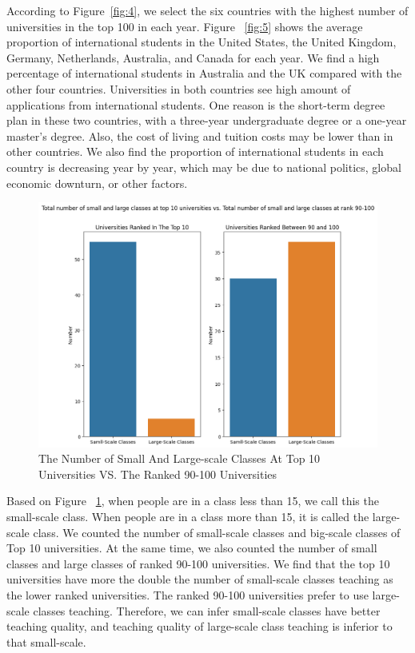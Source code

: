 \documentclass[a4paper]{article}
\begin{document}
\FloatBarrier
According to Figure~\ref{fig:4}, we select the six countries with the highest number of universities in the top 100 in each year. Figure ~\ref{fig:5} shows the average proportion of international students in the United States, the United Kingdom, Germany, Netherlands, Australia, and Canada for each year. We find a high percentage of international students in Australia and the UK compared with the other four countries. Universities in both countries see high amount of applications from international students. One reason is the short-term degree plan in these two countries, with a three-year undergraduate degree or a one-year master's degree. Also, the cost of living and tuition costs may be lower than in other countries. We also find the proportion of international students in each country is decreasing year by year, which may be due to national politics, global economic downturn, or other factors.

\FloatBarrier
\begin{figure}[h]
  \centering
  \includegraphics[scale=0.5]{images/HPlot3.png}
  \caption{The Number of Small And Large-scale Classes At Top 10 Universities VS. The Ranked 90-100 Universities}
  \label{fig:6}
\end{figure}
\FloatBarrier
Based on Figure ~\ref{fig:6}, when people are in a class less than 15, we call this the small-scale class. When people are in a class more than 15, it is called the large-scale class. We counted the number of small-scale classes and big-scale classes of Top 10 universities. At the same time, we also counted the number of small classes and large classes of ranked 90-100 universities. We find that the top 10 universities have more the double the number of small-scale classes teaching as the lower ranked universities. The ranked 90-100 universities prefer to use large-scale classes teaching. Therefore, we can infer small-scale classes have better teaching quality, and teaching quality of large-scale class teaching is inferior to that small-scale. 
\end{document}
